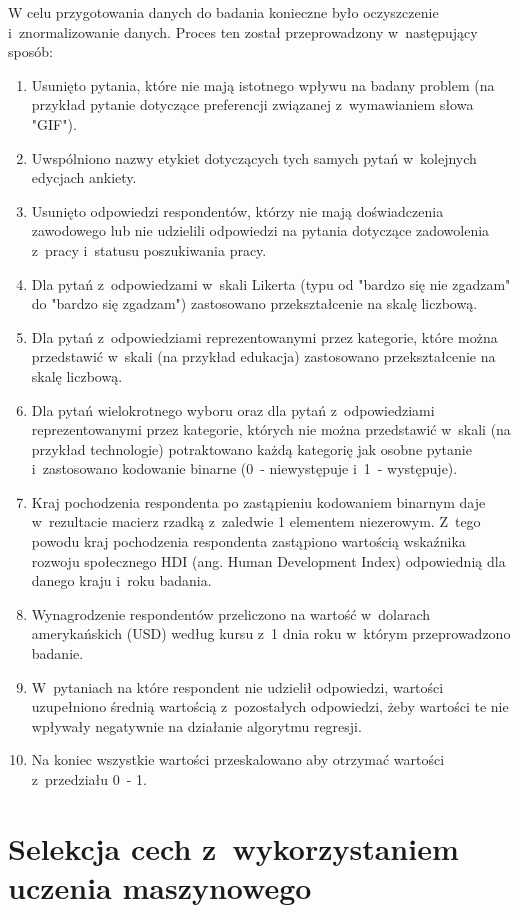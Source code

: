 W celu przygotowania danych do badania konieczne było oczyszczenie i~znormalizowanie danych. Proces ten został przeprowadzony w~następujący sposób:
\begin{enumerate}
    \item Usunięto pytania, które nie mają istotnego wpływu na badany problem (na przykład pytanie dotyczące preferencji związanej z~wymawianiem słowa "GIF").
    \item Uwspólniono nazwy etykiet dotyczących tych samych pytań w~kolejnych edycjach ankiety.
    \item Usunięto odpowiedzi respondentów, którzy nie mają doświadczenia zawodowego lub nie udzielili odpowiedzi na pytania dotyczące zadowolenia z~pracy i~statusu poszukiwania pracy.
    \item Dla pytań z~odpowiedzami w~skali Likerta (typu od "bardzo się nie zgadzam" do "bardzo się zgadzam") zastosowano przekształcenie na skalę liczbową.
    \item Dla pytań z~odpowiedziami reprezentowanymi przez kategorie, które można przedstawić w~skali (na przykład edukacja) zastosowano przekształcenie na skalę liczbową.
    \item Dla pytań wielokrotnego wyboru oraz dla pytań z~odpowiedziami reprezentowanymi przez kategorie, których nie można przedstawić w~skali (na przykład technologie) potraktowano każdą kategorię jak osobne pytanie i~zastosowano kodowanie binarne (0~- niewystępuje i~1~- występuje).
    \item Kraj pochodzenia respondenta po zastąpieniu kodowaniem binarnym daje w~rezultacie macierz rzadką z~zaledwie 1 elementem niezerowym. Z~tego powodu kraj pochodzenia respondenta zastąpiono wartością wskaźnika rozwoju społecznego HDI (ang. Human Development Index) \cite{hdi} odpowiednią dla danego kraju i~roku badania.
    \item Wynagrodzenie respondentów przeliczono na wartość w~dolarach amerykańskich (USD) według kursu z~1 dnia roku w~którym przeprowadzono badanie.
    \item W~pytaniach na które respondent nie udzielił odpowiedzi, wartości uzupełniono średnią wartością z~pozostałych odpowiedzi, żeby wartości te nie wpływały negatywnie na działanie algorytmu regresji.
    \item Na koniec wszystkie wartości przeskalowano aby otrzymać wartości z~przedziału 0~- 1.
\end{enumerate}


\section{Selekcja cech z~wykorzystaniem uczenia maszynowego}\label{sec:analysis:feature-selection-xgb}

